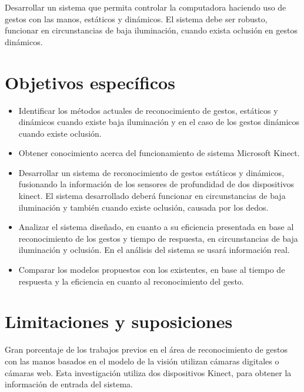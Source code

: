 Desarrollar un sistema que permita controlar la computadora haciendo uso de gestos con las manos, estáticos y dinámicos. El sistema debe ser robusto, funcionar en circunstancias de baja iluminación, cuando exista oclusión en gestos dinámicos.



\section{Objetivos espec\'ificos}\label{sec:objetivosEspecificos}

\begin{itemize}
	\item Identificar los m\'etodos actuales de reconocimiento de gestos, estáticos y din\'amicos cuando existe baja iluminación  y en el caso de los gestos dinámicos cuando existe oclusión. 
	
	\item  Obtener conocimiento acerca del funcionamiento de sistema Microsoft Kinect.
	
	\item Desarrollar un sistema de reconocimiento de gestos estáticos y dinámicos, fusionando la información de los sensores de  profundidad de dos dispositivos kinect. El sistema desarrollado deberá funcionar en circunstancias de baja iluminación y también cuando existe oclusión, causada por los dedos. 
	
	\item Analizar el sistema dise\~nado, en cuanto a su eficiencia presentada en base al reconocimiento de los gestos y tiempo de respuesta, en circunstancias de baja iluminación y oclusión. En el análisis del sistema se usar\'a información real.  
	
	\item Comparar los modelos propuestos  con los existentes, en base al tiempo de respuesta y la eficiencia en cuanto al reconocimiento del gesto. 
\end{itemize}



\section{Limitaciones y suposiciones}\label{sec:Limitaciones&Suposiciones}

Gran porcentaje de los trabajos previos en el \'area de reconocimiento de gestos con las manos basados en el modelo de la visión  utilizan c\'amaras digitales o c\'amaras web. Esta investigación utiliza dos dispositivos Kinect, para obtener la información de entrada del sistema.

